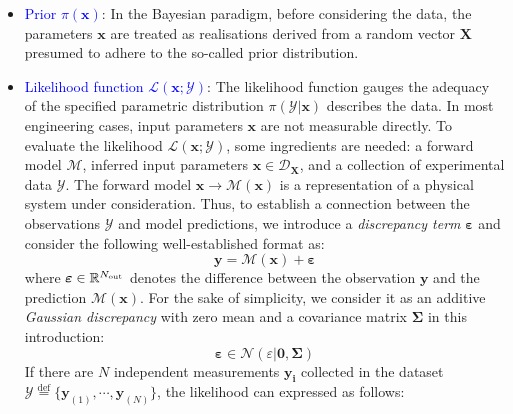 \begin{itemize}[left=0pt]
    \item \textcolor{blue}{Prior $\pi(\boldsymbol{x})$}: In the Bayesian paradigm, before considering the data, the parameters $\boldsymbol{x}$ are treated as realisations derived from a random vector $\boldsymbol{X}$ presumed to adhere to the so-called prior distribution.


    \item \textcolor{blue}{Likelihood function $\mathcal{L}(\boldsymbol{x};\mathcal{Y})$}: The likelihood function gauges the adequacy of the specified parametric distribution $\pi(\mathcal{Y}|\boldsymbol{x})$ describes the data. In most engineering cases, input parameters $\boldsymbol{x}$ are not measurable directly. To evaluate the likelihood $\mathcal{L}(\boldsymbol{x};\mathcal{Y})$, some ingredients are needed: a forward model $\mathcal{M}$, inferred input parameters $\boldsymbol{x} \in\mathcal{D}_{\boldsymbol{X}}$, and a collection of experimental data $\mathcal{Y}$.
The forward model $\boldsymbol{x} \rightarrow \boldsymbol{\mathcal{M}}(\boldsymbol{x})$ is a representation of a physical system under consideration. Thus, to establish a connection between the observations $\mathcal{Y}$ and model predictions, we introduce a \textit{discrepancy term} $\boldsymbol{\varepsilon}$ and consider the following well-established format as:
\begin{equation}
        \label{eq: discrepancy term}
        \boldsymbol{y} = \mathcal{M}(\boldsymbol{x}) + \boldsymbol{\varepsilon}
    \end{equation}
where $\boldsymbol{\varepsilon} \in \mathbb{R}^{N_{\rm{out}}}$ denotes the difference between the observation $\boldsymbol{y}$ and the prediction $\mathcal{M}(\boldsymbol{x})$. For the sake of simplicity, we consider it as an additive \textit{Gaussian discrepancy} with zero mean and a covariance matrix $\boldsymbol{\Sigma}$ in this introduction:
\begin{equation}
            \label{eq: Gaussian discrepancy}
            \boldsymbol{\varepsilon} \in \mathcal{N}(\varepsilon|\boldsymbol{0},\boldsymbol{\Sigma})
        \end{equation}
If there are $N$ independent measurements $\boldsymbol{y_{i}}$ collected in the dataset $\mathcal{Y} \stackrel{\mathrm{def}}{=} \{{\boldsymbol{y}_{(1)}},\cdots,{\boldsymbol{y}_{(N)}}\}$, the likelihood can expressed as follows:
\begin{equation}        
        \label{eq: Likelihood function}
        \begin{aligned}

\end{aligned}
\end{equation}
\end{itemize}
